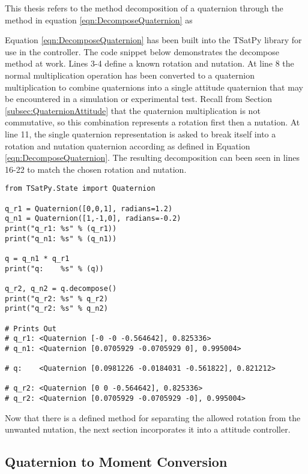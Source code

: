 This thesis refers to the method decomposition of a quaternion through the method in equation \ref{eqn:DecomposeQuaternion} as


Equation \ref{eqn:DecomposeQuaternion} has been built into the TSatPy library for use in the controller.  The code snippet below demonstrates the decompose method at work.  Lines 3-4 define a known rotation and nutation.  At line 8 the normal multiplication operation has been converted to a quaternion multiplication to combine quaternions into a single attitude quaternion that may be encountered in a simulation or experimental test.  Recall from Section \ref{subsec:QuaternionAttitude} that the quaternion multiplication is not commutative, so this combination represents a rotation first then a nutation.  At line 11, the single quaternion representation is asked to break itself into a rotation and nutation quaternion according as defined in Equation \ref{eqn:DecomposeQuaternion}.  The resulting decomposition can been seen in lines 16-22 to match the chosen rotation and nutation.

\begin{singlespace}
  \begin{verbatim}
from TSatPy.State import Quaternion

q_r1 = Quaternion([0,0,1], radians=1.2)
q_n1 = Quaternion([1,-1,0], radians=-0.2)
print("q_r1: %s" % (q_r1))
print("q_n1: %s" % (q_n1))

q = q_n1 * q_r1
print("q:    %s" % (q))

q_r2, q_n2 = q.decompose()
print("q_r2: %s" % q_r2)
print("q_r2: %s" % q_n2)

# Prints Out
# q_r1: <Quaternion [-0 -0 -0.564642], 0.825336>
# q_n1: <Quaternion [0.0705929 -0.0705929 0], 0.995004>

# q:    <Quaternion [0.0981226 -0.0184031 -0.561822], 0.821212>

# q_r2: <Quaternion [0 0 -0.564642], 0.825336>
# q_r2: <Quaternion [0.0705929 -0.0705929 -0], 0.995004>
  \end{verbatim}
\nocite{minted}
\end{singlespace}

Now that there is a defined method for separating the allowed rotation from the unwanted nutation, the next section incorporates it into a attitude controller.

\subsection{Quaternion to Moment Conversion}

